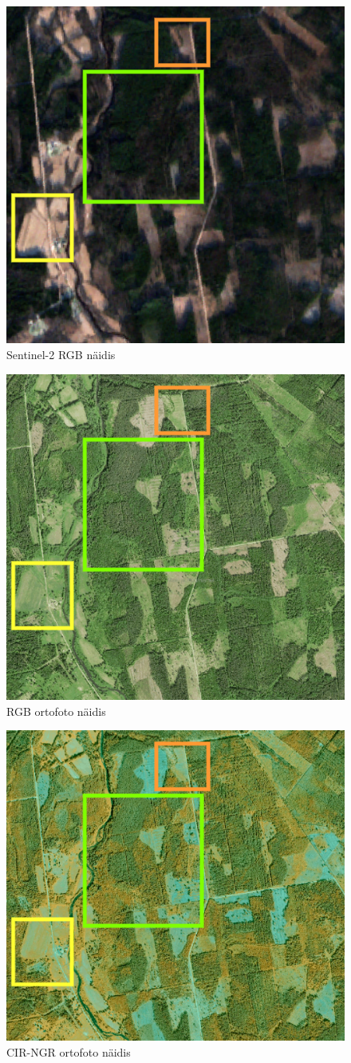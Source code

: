 \begin{figure}[H]
    \centering
    \includegraphics[width=.6\textwidth]{figures/andmestik/tuvastamis_sent2_naidis.drawio.png}
    \caption{Sentinel-2 RGB näidis}
    \label{fig:sent_mask_naidis}
\end{figure}

\begin{figure}[H]
    \centering
    \includegraphics[width=.6\textwidth]{figures/andmestik/tuvastamis_orto_naidis.drawio.png}
    \caption{RGB ortofoto näidis}
    \label{fig:orto_mask_naidis}
\end{figure}

\begin{figure}[H]
    \centering
    \includegraphics[width=.6\textwidth]{figures/andmestik/tuvastamis_orto_nir_naidis.drawio.png}
    \caption{CIR-NGR ortofoto näidis}
    \label{fig:orto_nir_mask_naidis}
\end{figure}